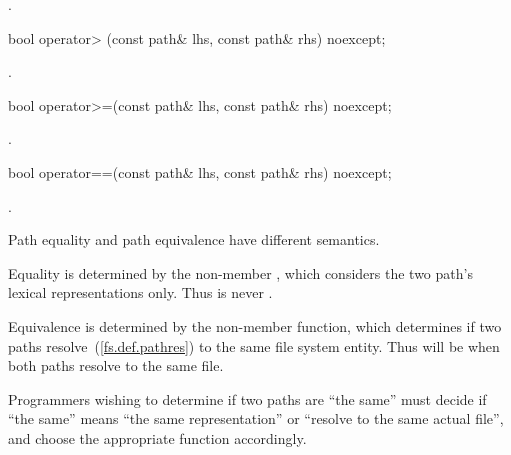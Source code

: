 \begin{itemdescr}
\pnum
\returns {}.
\end{itemdescr}

%
\begin{itemdecl}
bool operator> (const path& lhs, const path& rhs) noexcept;
\end{itemdecl}

\begin{itemdescr}
\pnum
\returns {}.
\end{itemdescr}

%
\begin{itemdecl}
bool operator>=(const path& lhs, const path& rhs) noexcept;
\end{itemdecl}

\begin{itemdescr}
\pnum
\returns {}.
\end{itemdescr}

%
\begin{itemdecl}
bool operator==(const path& lhs, const path& rhs) noexcept;
\end{itemdecl}

\begin{itemdescr}
\pnum
\returns {}.

\pnum
\begin{note} Path equality and path equivalence have different semantics.

\pnum
Equality is determined by the  non-member , which considers the two path's lexical
  representations only. Thus  is never .

\pnum
Equivalence is determined by the  non-member function, which determines if two paths resolve~(\ref{fs.def.pathres}) to the same file system entity.
  Thus  will be  when both paths resolve to the same file.

\pnum
Programmers wishing to determine if two paths are ``the same'' must decide if
  ``the same'' means ``the same representation'' or ``resolve to the same actual
  file'', and choose the appropriate function accordingly. \end{note}
\end{itemdescr}

